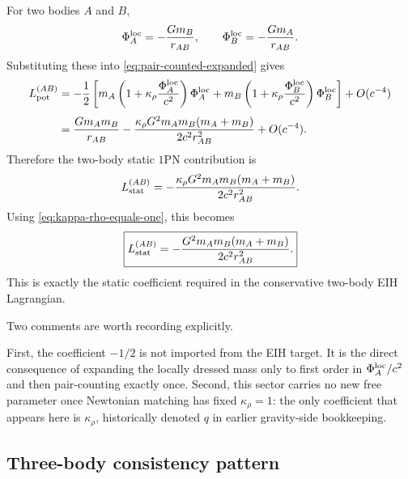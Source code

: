 \documentclass[11pt]{article}
\newcommand{\krho}{\kappa_{\rho}}
\begin{document}
For two bodies \(A\) and \(B\),
\begin{equation}
\Phi_A^{\rm loc}=-\frac{Gm_B}{r_{AB}},
\qquad
\Phi_B^{\rm loc}=-\frac{Gm_A}{r_{AB}}.
\label{eq:two-body-local-potentials}
\end{equation}
Substituting these into \eqref{eq:pair-counted-expanded} gives
\begin{align}
L_{\rm pot}^{(AB)}
&=
-\frac12\left[
m_A\left(1+\krho\frac{\Phi_A^{\rm loc}}{c^2}\right)\Phi_A^{\rm loc}
+
m_B\left(1+\krho\frac{\Phi_B^{\rm loc}}{c^2}\right)\Phi_B^{\rm loc}
\right]
+ O(c^{-4})
\nonumber\\[3pt]
&=
\frac{Gm_A m_B}{r_{AB}}
-\frac{\krho G^2 m_A m_B(m_A+m_B)}{2c^2 r_{AB}^2}
+ O(c^{-4}).
\label{eq:two-body-static-general}
\end{align}
Therefore the two-body static \(1\)PN contribution is
\begin{equation}
L_{\rm stat}^{(AB)}
=
-\frac{\krho G^2 m_A m_B(m_A+m_B)}{2c^2 r_{AB}^2}.
\label{eq:static-1pn-term-general}
\end{equation}
Using \eqref{eq:kappa-rho-equals-one}, this becomes
\begin{equation}
\boxed{
L_{\rm stat}^{(AB)}
=
-\frac{G^2 m_A m_B(m_A+m_B)}{2c^2 r_{AB}^2}.
}
\label{eq:static-1pn-term}
\end{equation}
This is exactly the static coefficient required in the conservative two-body EIH
Lagrangian.

Two comments are worth recording explicitly.

First, the coefficient \(-1/2\) is not imported from the EIH target. It is the direct
consequence of expanding the locally dressed mass only to first order in
\(\Phi_A^{\rm loc}/c^2\) and then pair-counting exactly once. Second, this sector carries
no new free parameter once Newtonian matching has fixed \(\krho=1\): the only coefficient
that appears here is \(\krho\), historically denoted \(q\) in earlier gravity-side
bookkeeping.

\subsection{Three-body consistency pattern}
\label{sec:three-body-pattern}
\end{document}
